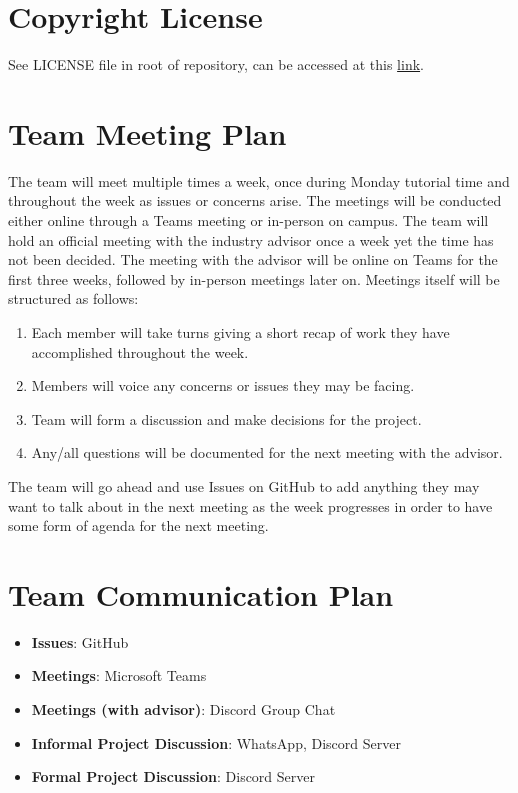 \documentclass{article}
\begin{document}
\section{Copyright License}

See LICENSE file in root of repository, can be accessed at this
\href{https://github.com/ssm-lab/capstone--source-code-optimizer/blob/main/LICENSE}{link}.

\section{Team Meeting Plan}

\hspace{\parindent} The team will meet multiple times a week, once
during Monday tutorial time and throughout the week as issues or
concerns arise. The meetings will be conducted either online through
a Teams meeting or in-person on campus. The team
will hold an official meeting with the industry advisor once a week
yet the time has not been decided. The meeting with the advisor will
be online on Teams for the first three weeks, followed by in-person
meetings later on. Meetings itself will be structured as follows:
\begin{enumerate}
  \item Each member will take turns giving a short recap of work they
    have accomplished throughout the week.
  \item Members will voice any concerns or issues they may be facing.
  \item Team will form a discussion and make decisions for the project.
  \item Any/all questions will be documented for the next meeting
    with the advisor.
\end{enumerate}
The team will go ahead and use Issues on GitHub to add anything they
may want to talk about in the next meeting as the week progresses in
order to have some form of agenda for the next meeting.

\section{Team Communication Plan}

\begin{itemize}

  \item \textbf{Issues}: GitHub
  \item \textbf{Meetings}: Microsoft Teams
  \item \textbf{Meetings (with advisor)}: Discord Group Chat
  \item \textbf{Informal Project Discussion}: WhatsApp, Discord Server
  \item \textbf{Formal Project Discussion}: Discord Server

\end{itemize}
\end{document}
